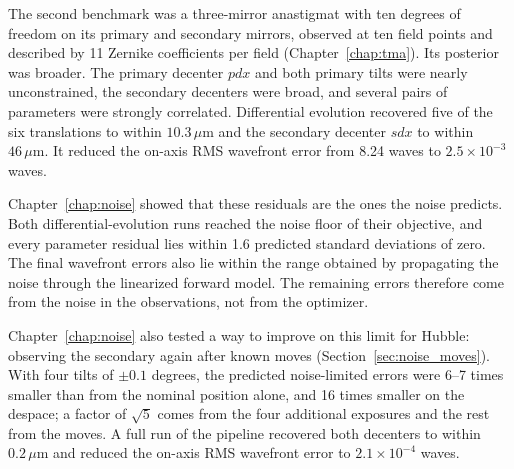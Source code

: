 The second benchmark was a three-mirror anastigmat with ten degrees of freedom on its primary and secondary mirrors, observed at ten field points and described by 11 Zernike coefficients per field (Chapter~\ref{chap:tma}). Its posterior was broader. The primary decenter $pdx$ and both primary tilts were nearly unconstrained, the secondary decenters were broad, and several pairs of parameters were strongly correlated. Differential evolution recovered five of the six translations to within $10.3\,\mu\mathrm{m}$ and the secondary decenter $sdx$ to within $46\,\mu\mathrm{m}$. It reduced the on-axis RMS wavefront error from 8.24 waves to $2.5\times10^{-3}$ waves.

Chapter~\ref{chap:noise} showed that these residuals are the ones the noise predicts. Both differential-evolution runs reached the noise floor of their objective, and every parameter residual lies within 1.6 predicted standard deviations of zero. The final wavefront errors also lie within the range obtained by propagating the noise through the linearized forward model. The remaining errors therefore come from the noise in the observations, not from the optimizer.

Chapter~\ref{chap:noise} also tested a way to improve on this limit for Hubble: observing the secondary again after known moves (Section~\ref{sec:noise_moves}). With four tilts of $\pm0.1$ degrees, the predicted noise-limited errors were 6--7 times smaller than from the nominal position alone, and 16 times smaller on the despace; a factor of $\sqrt{5}$ comes from the four additional exposures and the rest from the moves. A full run of the pipeline recovered both decenters to within $0.2\,\mu\mathrm{m}$ and reduced the on-axis RMS wavefront error to $2.1\times10^{-4}$ waves.

